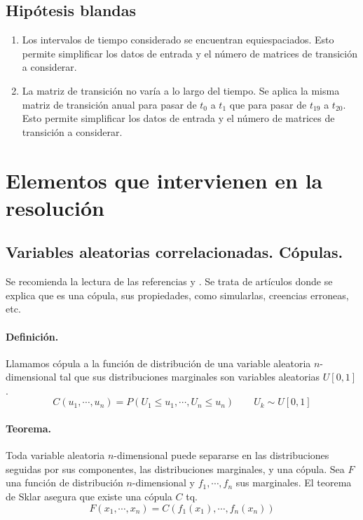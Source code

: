 \subsection{Hip\'otesis blandas}
\begin{enumerate}
\item Los intervalos de tiempo considerado se encuentran equiespaciados. Esto 
permite simplificar los datos de entrada y el n\'umero de matrices de 
transici\'on a considerar.
\item La matriz de transici\'on no var\'ia a lo largo del tiempo. Se aplica 
la misma matriz de transici\'on anual para pasar de $t_0$ a $t_1$ que para 
pasar de $t_{19}$ a $t_{20}$. Esto permite simplificar los datos de entrada y 
el n\'umero de matrices de transici\'on a considerar.
\end{enumerate}


\section{Elementos que intervienen en la resoluci\'on}

\subsection{Variables aleatorias correlacionadas. C\'opulas.}

Se recomienda la lectura de las referencias \cite{copu:wang} y 
\cite{copu:pitfalls}. Se trata de art\'iculos donde se explica que es una 
c\'opula, sus propiedades, como simularlas, creencias erroneas, etc.

\paragraph{Definici\'on.} Llamamos c\'opula a la funci\'on de distribuci\'on
de una variable aleatoria $n$-dimensional tal que sus distribuciones marginales 
son variables aleatorias $U[0,1]$.
\begin{displaymath}
C(u_1, \cdots,u_n)=P(U_1 \leq u_1, \cdots, U_n \leq u_n) \qquad U_k \sim U[0,1]
\end{displaymath}

\paragraph{Teorema.} Toda variable aleatoria $n$-dimensional puede separarse 
en las distribuciones seguidas por sus componentes, las distribuciones marginales,
y una c\'opula. Sea $F$ una funci\'on de distribuci\'on $n$-dimensional y 
$f_1,\cdots, f_n$ sus marginales. El teorema de Sklar asegura que existe una 
c\'opula $C$ tq.
\begin{displaymath}
F(x_1, \cdots,x_n) = C(f_1(x_1), \cdots, f_n(x_n)) 
\end{displaymath}

